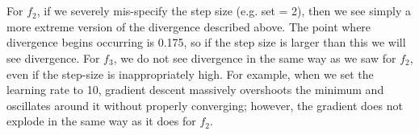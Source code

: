 \documentclass[12pt,twoside]{article}
\begin{document}
\\ \\
For $f_2$, if we severely mis-specify the step size (e.g. set = 2), then we see simply a more extreme version of the divergence described above. The point where divergence begins occurring is 0.175, so if the step size is larger than this we will see divergence. For $f_3$, we do not see divergence in the same way as we saw for $f_2$, even if the step-size is inappropriately high. For example, when we set the learning rate to 10, gradient descent massively overshoots the minimum and oscillates around it without properly converging; however, the gradient does not explode in the same way as it does for $f_2$. 
\end{document}
